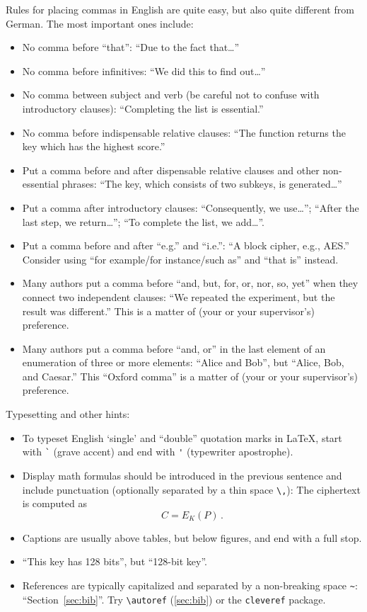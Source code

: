 \documentclass[11pt,
  titlepage=false,
]{scrreprt}
\begin{document}
Rules for placing commas in English are quite easy, but also quite different from German.
The most important ones include:
\begin{itemize}
  \item No comma before ``that'': ``Due to the fact that\dots''
  \item No comma before infinitives: ``We did this to find out\dots''
  \item No comma between subject and verb (be careful not to confuse with introductory clauses): ``Completing the list is essential.''
  \item No comma before indispensable relative clauses: ``The function returns the key which has the highest score.''
  \item Put a comma before and after dispensable relative clauses and other non-essential phrases: ``The key, which consists of two subkeys, is generated\dots''
  \item Put a comma after introductory clauses: ``Consequently, we use\dots''; ``After the last step, we return\dots''; ``To complete the list, we add\dots''.
  \item Put a comma before and after ``e.g.'' and ``i.e.'': ``A block cipher, e.g., AES.''
    Consider using ``for example/for instance/such as'' and ``that is'' instead.
  \item Many authors put a comma before ``and, but, for, or, nor, so, yet'' when they connect two independent clauses: ``We repeated the experiment, but the result was different.''
    This is a matter of (your or your supervisor's) preference.
  \item Many authors put a comma before ``and, or'' in the last element of an enumeration of three or more elements: ``Alice and Bob'', but ``Alice, Bob, and Caesar.''
    This ``Oxford comma'' is a matter of (your or your supervisor's) preference.
\end{itemize}

Typesetting and other hints:
\begin{itemize}
  \item To typeset English `single' and ``double'' quotation marks in \LaTeX, start with \verb|`| (grave accent) and end with \verb|'| (typewriter apostrophe).
  \item Display math formulas should be introduced in the previous sentence and include punctuation (optionally separated by a thin space \verb|\,|): The ciphertext is computed as
    \[C = E_K(P)\,.\]
  \item Captions are usually above tables, but below figures, and end with a full stop.
  \item ``This key has 128 bits'', but ``128-bit key''.
  \item References are typically capitalized and separated by a non-breaking space \verb|~|: ``Section~\ref{sec:bib}''.
    Try \verb|\autoref| (\autoref{sec:bib}) or the \verb|cleveref| package. %
\end{itemize}
\end{document}
